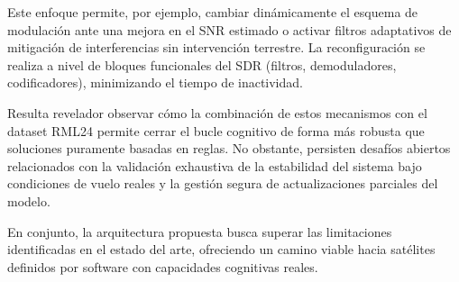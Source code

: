 Este enfoque permite, por ejemplo, cambiar dinámicamente el esquema de modulación ante una mejora en el SNR estimado o activar filtros adaptativos de mitigación de interferencias sin intervención terrestre. La reconfiguración se realiza a nivel de bloques funcionales del SDR (filtros, demoduladores, codificadores), minimizando el tiempo de inactividad.

Resulta revelador observar cómo la combinación de estos mecanismos con el dataset RML24 \cite{Zhang2026} permite cerrar el bucle cognitivo de forma más robusta que soluciones puramente basadas en reglas. No obstante, persisten desafíos abiertos relacionados con la validación exhaustiva de la estabilidad del sistema bajo condiciones de vuelo reales y la gestión segura de actualizaciones parciales del modelo.

En conjunto, la arquitectura propuesta busca superar las limitaciones identificadas en el estado del arte, ofreciendo un camino viable hacia satélites definidos por software con capacidades cognitivas reales.